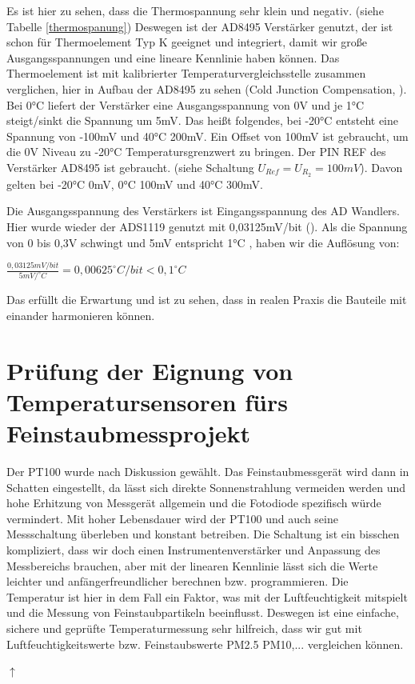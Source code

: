 \documentclass[12pt]{article}
\begin{document}
Es ist hier zu sehen, dass die Thermospannung sehr klein und negativ. (siehe Tabelle \ref{thermospanung}) Deswegen ist der AD8495 Verstärker genutzt, der ist schon für Thermoelement Typ K geeignet und integriert, damit wir große Ausgangsspannungen und eine lineare Kennlinie haben können. Das Thermoelement ist mit kalibrierter Temperaturvergleichsstelle zusammen verglichen, hier in Aufbau der AD8495 zu sehen (Cold Junction Compensation, \cite{AnalogDevicesInc..2018}). Bei 0°C liefert der Verstärker eine Ausgangsspannung von 0V und je 1°C steigt/sinkt die Spannung um 5mV. Das heißt folgendes, bei -20°C entsteht eine Spannung von -100mV und 40°C 200mV. Ein Offset von 100mV ist gebraucht, um die 0V Niveau zu -20°C Temperatursgrenzwert zu bringen. Der PIN REF des Verstärker AD8495 ist gebraucht. (siehe Schaltung $U_{Ref} = U_{R_2} = 100mV$). Davon gelten bei -20°C 0mV, 0°C 100mV und 40°C 300mV. 

Die Ausgangsspannung des Verstärkers ist Eingangsspannung des AD Wandlers. Hier wurde wieder der ADS1119 genutzt mit 0,03125mV/bit (\cite{TexasInstruments.2018}). Als die Spannung von 0 bis 0,3V schwingt und 5mV entspricht 1°C , haben wir die Auflösung von: 

\begin{center}
  $\frac{0,03125mV/bit}{5mV/^\circ C} = 0,00625 ^\circ C/bit < 0,1^\circ C$
\end{center}

Das erfüllt die Erwartung und ist zu sehen, dass in realen Praxis die Bauteile mit einander harmonieren können.

\section{Prüfung der Eignung von Temperatursensoren fürs Feinstaubmessprojekt}

Der PT100 wurde nach Diskussion gewählt. Das Feinstaubmessgerät wird dann in Schatten eingestellt, da lässt sich direkte Sonnenstrahlung vermeiden werden und hohe Erhitzung von Messgerät allgemein und die Fotodiode spezifisch würde vermindert. Mit hoher Lebensdauer wird der PT100 und auch seine Messschaltung überleben und konstant betreiben. Die Schaltung ist ein bisschen kompliziert, dass wir doch einen Instrumentenverstärker und Anpassung des Messbereichs brauchen, aber mit der linearen Kennlinie lässt sich die Werte leichter und anfängerfreundlicher berechnen bzw. programmieren. Die Temperatur ist hier in dem Fall ein Faktor, was mit der Luftfeuchtigkeit mitspielt und die Messung von Feinstaubpartikeln beeinflusst. Deswegen ist eine einfache, sichere und geprüfte Temperaturmessung sehr hilfreich, dass wir gut mit Luftfeuchtigkeitswerte bzw. Feinstaubswerte PM2.5 PM10,... vergleichen können.

\newpage
\printbibliography
{}
\begin{center}
\hyperref[sec:temperatursensoren]{\large{$\uparrow$}}
\end{center}
\newpage

\end{document}
